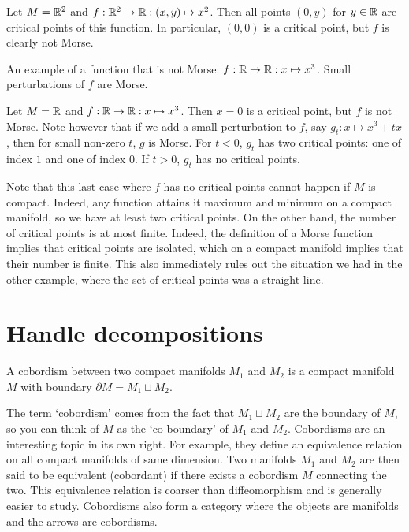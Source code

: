 \begin{eg}
    Let $M = \mathbb{R}^2$ and $f: \mathbb{R}^2 \to  \mathbb{R}: (x, y) \mapsto  x^2$.
    Then all points $(0, y)$ for  $y \in \mathbb{R}$ are critical points of this function.
    In particular, $(0, 0)$ is a critical point, but $f$ is clearly not Morse.
\end{eg}
\begin{marginfigure}
    \centering
    \caption{}
    \label{fig:non-example-of-morse-function}
\end{marginfigure}
\begin{marginfigure}
    \centering
    \caption{An example of a function that is not Morse: $f: \mathbb{R} \to  \mathbb{R}: x \mapsto  x^3$.
        Small perturbations of $f$ are Morse.
    }
    \label{fig:non-examples-of-morse-functions}
\end{marginfigure}
\begin{eg}
    Let $M = \mathbb{R}$ and $f : \mathbb{R} \to  \mathbb{R}: x \mapsto x^3$.
    Then $x = 0$ is a critical point, but $f$ is not Morse.
    Note however that if we add a small perturbation to $f$, say $g_t: x\mapsto x^3+ tx$, then for small non-zero $t$, $g$ is Morse. For $t < 0$, $g_t$  has two critical points: one of index $1$ and one of index $0$.
    If $t > 0$,  $g_t$ has no critical points.
\end{eg}

Note that this last case where $f$ has no critical points cannot happen if $M$ is compact.
Indeed, any function attains it maximum and minimum on a compact manifold, so we have at least two critical points.
On the other hand, the number of critical points is at most finite.
Indeed, the definition of a Morse function implies that critical points are isolated, which on a compact manifold implies that their number is finite.
This also immediately rules out the situation we had in the other example, where the set of critical points was a straight line.

\section{Handle decompositions}

\begin{definition}
A cobordism between two compact manifolds $M_1$ and $M_2$ is a compact manifold $M$  with boundary $\partial M = M_1 \sqcup M_2$.
\end{definition}


The term `cobordism' comes from the fact that $M_1 \sqcup M_2$ are the boundary of $M$, so you can think of $M$ as the `co-boundary' of $M_1$ and $M_2$.
Cobordisms are an interesting topic in its own right.
For example, they define an equivalence relation on all compact manifolds of same dimension. Two manifolds $ M_1$ and $M_2$ are then said to be equivalent (cobordant) if there exists a cobordism $M$ connecting the two.
This equivalence relation is coarser than diffeomorphism and is generally easier to study.
Cobordisms also form a category where the objects are manifolds and the arrows are cobordisms.

